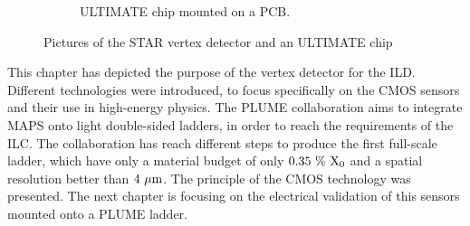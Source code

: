 \begin{figure}[!h]
\begin{subfigure}[t]{0.4\textwidth}
        \caption{ULTIMATE chip mounted on a PCB. %
        }
        \label{fig:ultimate}
    \end{subfigure}
    \caption{Pictures of the STAR vertex detector and an ULTIMATE chip}\label{fig:Mi28}
    \end{figure}    

    This chapter has depicted the purpose of the vertex detector for the \gls{ILD}.
    Different technologies were introduced, to focus specifically on the \gls{CMOS} sensors and their use in high-energy physics.
    The \gls{PLUME} collaboration aims to integrate \gls{MAPS} onto light double-sided ladders, in order to reach the requirements of the \gls{ILC}.
    The collaboration has reach different steps to produce the first full-scale ladder, which have only a material budget of only $0.35~\%~\rm{X_0}$ and a spatial resolution better than $4~\rm{\mu m}$.
    The principle of the \gls{CMOS} technology was presented. 
    The next chapter is focusing on the electrical validation of this sensors mounted onto a PLUME ladder.

    



